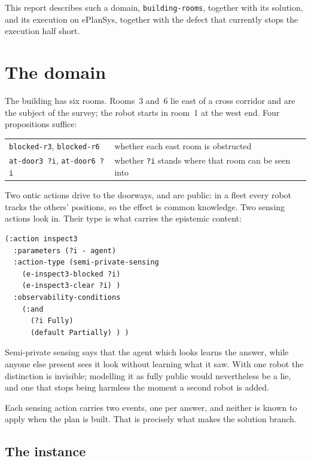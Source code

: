 \documentclass[11pt,a4paper]{article}
\theoremstyle{definition}
\newcommand{\code}[1]{\texttt{\small #1}}
\begin{document}
This report describes such a domain, \code{building-rooms}, together with its
solution,
and its execution on ePlanSys, together with the defect that currently stops the
execution half short.

\section{The domain}

The building has six rooms. Rooms~3 and~6 lie east of a cross corridor and are
the subject of the survey; the robot starts in room~1 at the west end. Four
propositions suffice:

\begin{center}
\begin{tabular}{@{}ll@{}}
\toprule
\code{blocked-r3}, \code{blocked-r6} & whether each east room is obstructed \\
\code{at-door3 ?i}, \code{at-door6 ?i} & whether \code{?i} stands where that room can be seen into \\
\bottomrule
\end{tabular}
\end{center}

Two ontic actions drive to the doorways, and are public: in a fleet every robot
tracks the others' positions, so the effect is common knowledge. Two sensing
actions look in. Their type is what carries the epistemic content:

\begin{lstlisting}
(:action inspect3
  :parameters (?i - agent)
  :action-type (semi-private-sensing
    (e-inspect3-blocked ?i)
    (e-inspect3-clear ?i) )
  :observability-conditions
    (:and
      (?i Fully)
      (default Partially) ) )
\end{lstlisting}

Semi-private sensing says that the agent which looks learns the answer, while
anyone else present sees it look without learning what it saw. With one robot
the distinction is invisible; modelling it as fully public would nevertheless be
a lie, and one that stops being harmless the moment a second robot is added.

Each sensing action carries two events, one per answer, and neither is known to
apply when the plan is built. That is precisely what makes the solution branch.

\subsection{The instance}
\end{document}
